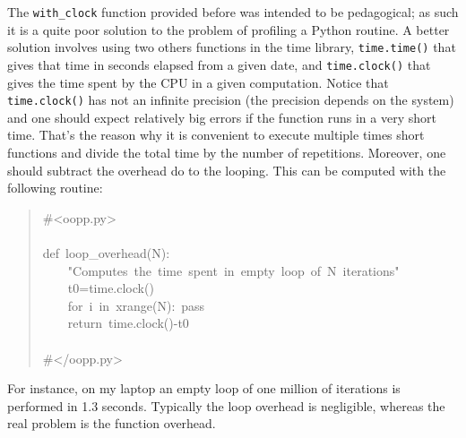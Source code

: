 \documentclass[10pt,english]{article}
\begin{document}
The \texttt{with{\_}clock} function provided before was intended to be
pedagogical; as such it is a quite poor solution to the
problem of profiling a Python routine. A better solution involves
using two others functions in the time library, \texttt{time.time()} 
that gives that time in seconds elapsed from a given date, and 
\texttt{time.clock()} that gives the time spent by the CPU in a given 
computation. Notice that \texttt{time.clock()} has not an infinite
precision (the precision depends on the system) and one 
should expect relatively big errors if the function runs in
a very short time. That's the reason why it is convenient
to execute multiple times short functions and divide the total
time by the number of repetitions. Moreover, one should subtract the
overhead do to the looping. This can be computed with the following
routine:
\begin{quote}
\begin{ttfamily}\begin{flushleft}
\mbox{{\#}<oopp.py>}\\
\mbox{}\\
\mbox{def~loop{\_}overhead(N):}\\
\mbox{~~~~"Computes~the~time~spent~in~empty~loop~of~N~iterations"}\\
\mbox{~~~~t0=time.clock()}\\
\mbox{~~~~for~i~in~xrange(N):~pass}\\
\mbox{~~~~return~time.clock()-t0}\\
\mbox{}\\
\mbox{{\#}</oopp.py>}
\end{flushleft}\end{ttfamily}
\end{quote}

For instance, on my laptop an empty loop of one million of iterations
is performed in 1.3 seconds. Typically the loop overhead is negligible,
whereas the real problem is the function overhead.
\end{document}
